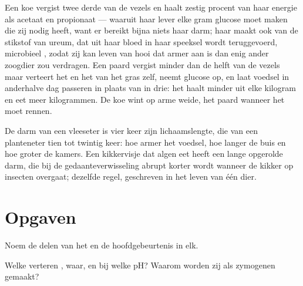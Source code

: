 \begin{example}\label{ex:b1:digestion-absorption:cowhorse}
Een koe vergist twee derde van de vezels en haalt zestig procent van haar
energie als acetaat en propionaat --- waaruit haar lever elke gram glucose
moet maken die zij nodig heeft, want er bereikt bijna niets haar darm; haar
 maakt ook van de stikstof van ureum, dat uit haar bloed in haar
speeksel wordt teruggevoerd, microbieel , zodat zij kan leven van hooi
dat armer aan  is dan enig ander zoogdier zou verdragen. Een paard
vergist minder dan de helft van de vezels maar verteert het  en het
 van het gras zelf, neemt glucose op, en laat voedsel in anderhalve
dag passeren in plaats van in drie: het haalt minder uit elke kilogram en
eet meer kilogrammen. De koe wint op arme weide, het paard wanneer het moet
rennen.
\end{example}

\begin{remark}\label{rem:b1:digestion-absorption:length}
De darm van een vleeseter is vier keer zijn lichaamslengte, die van een
planteneter tien tot twintig keer: hoe armer het voedsel, hoe langer de
buis en hoe groter de kamers. Een kikkervisje dat algen eet heeft een lange
opgerolde darm, die bij de gedaanteverwisseling abrupt korter wordt wanneer
de kikker op insecten overgaat; dezelfde regel, geschreven in het leven van
één dier.
\end{remark}

\section{Opgaven}

\begin{exercise}[$\star$]\label{exo:b1:digestion-absorption:1}
Noem de delen van het  en de hoofdgebeurtenis in elk.
\end{exercise}

\begin{exercise}[$\star$]\label{exo:b1:digestion-absorption:2}
Welke  verteren , waar, en bij welke pH? Waarom worden zij als
zymogenen gemaakt?
\end{exercise}

